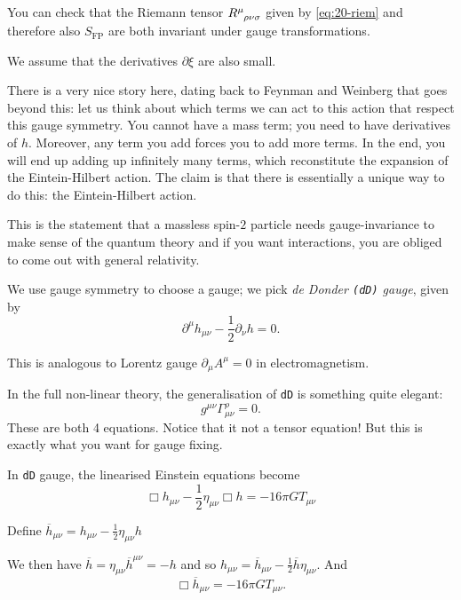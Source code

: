 \begin{exercise}
  You can check that the Riemann tensor $R\indices{^{\mu}_{\rho\nu\sigma}}$ given by \eqref{eq:20-riem} and therefore also $S_{\text{FP}}$ are both invariant under gauge transformations.
\end{exercise}

\begin{leftbar}
  \begin{note}
    We assume that the derivatives $\partial \xi$ are also small.
  \end{note}
\end{leftbar}

\begin{remark}
  There is a very nice story here, dating back to Feynman and Weinberg that goes beyond this: let us think about which terms we can act to this action that respect this gauge symmetry.
  You cannot have a mass term; you need to have derivatives of $h$. Moreover, any term you add forces you to add more terms. In the end, you will end up adding up infinitely many terms, which reconstitute the expansion of the Eintein-Hilbert action.
  The claim is that there is essentially a unique way to do this: the Eintein-Hilbert action.

  This is the statement that a massless spin-$2$ particle needs gauge-invariance to make sense of the quantum theory and if you want interactions, you are obliged to come out with general relativity.
\end{remark}

We use gauge symmetry to choose a gauge; we pick \emph{de Donder \texttt{(dD)} gauge}, given by
\begin{equation}
  \partial^{\mu} h_{\mu\nu} - \frac{1}{2} \partial_{\nu} h = 0.
\end{equation}

This is analogous to Lorentz gauge $\partial_{\mu} A^{\mu} = 0$ in electromagnetism.

\begin{remark}
  In the full non-linear theory, the generalisation of \texttt{dD} is something quite elegant: 
  \begin{equation}
    g^{\mu\nu} \Gamma^{\rho}_{\mu\nu} = 0.
  \end{equation}
  These are both 4 equations. Notice that it not a tensor equation! But this is exactly what you want for gauge fixing.
\end{remark}

In \texttt{dD} gauge, the linearised Einstein equations become
\begin{equation}
  \Box h_{\mu\nu} - \frac{1}{2} \eta_{\mu\nu} \Box h = -16 \pi G T_{\mu\nu}
\end{equation}
\begin{definition}[]
  Define $\overline{h}_{\mu\nu} = h_{\mu\nu} - \frac{1}{2} \eta_{\mu\nu} h$ 
\end{definition}
We then have $\overline{h} = \eta_{\mu\nu} \overline{h}^{\mu\nu} = -h$ and so $h_{\mu\nu} = \overline{h}_{\mu\nu} - \frac{1}{2} \overline{h}\eta_{\mu\nu}$. 
And 
\begin{equation}
  \Box \overline{h}_{\mu\nu} = - 16 \pi G T_{\mu\nu}.
\end{equation}

